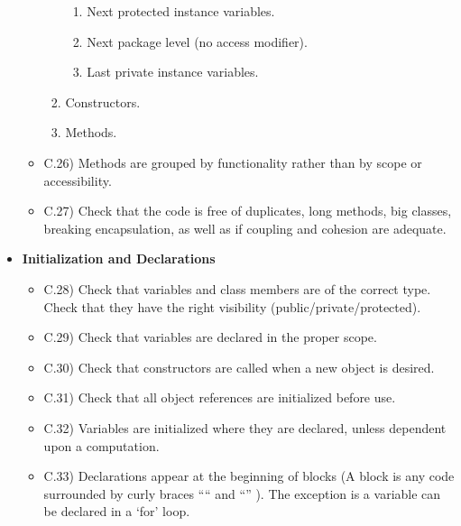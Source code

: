 \documentclass[../../codeInspection.tex]{subfiles}
\begin{document}
\begin{itemize}
\begin{itemize}
\begin{enumerate}
\begin{enumerate}
											\item Next protected instance variables.

											\item Next package level (no access modifier).

											\item Last private instance variables.

										\end{enumerate}

									\item Constructors.

									\item Methods.

								\end{enumerate}

							\item C.26) Methods are grouped by functionality rather than by scope or accessibility.

							\item C.27) Check that the code is free of duplicates, long methods, big classes, breaking encapsulation, as well as if coupling and cohesion are adequate.

						\end{itemize}

				\item 	\textbf{Initialization and Declarations}
						\begin{itemize}

							\item C.28) Check that variables and class members are of the correct type. Check that they have the right visibility (public/private/protected).

							\item C.29) Check that variables are declared in the proper scope.

							\item C.30) Check that constructors are called when a new object is desired.

							\item C.31) Check that all object references are initialized before use.

							\item C.32) Variables are initialized where they are declared, unless dependent upon a computation.

							\item C.33) Declarations appear at the beginning of blocks (A block is any code surrounded by curly braces “{“ and “}” ). The exception is a variable can be declared in a ‘for’ loop.


\end{itemize}
\end{itemize}
\end{document}
